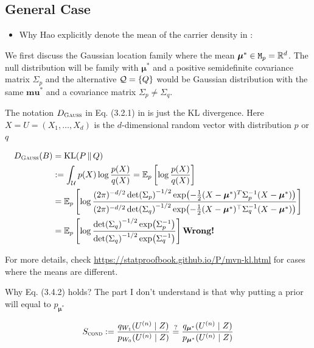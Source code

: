 \subsection{General Case}

\begin{itemize}
	\item Why Hao explicitly denote the mean of the carrier density in \cite{grunwaldSafeTesting2024}:
\end{itemize}

We first discuss the Gaussian location family where the mean $\bm{\mu}^*\in\mathtt{M}_p=\mathbb{R}^d$.
The null distribution will be family with $\bm{\mu}^*$ and a positive semidefinite covariance matrix $\Sigma_p$
and the alternative $\mathcal{Q}=\{Q\}$ would be Gaussian distribution with the same $\bm{mu}^*$ and
a covariance matrix $\Sigma_p \not= \Sigma_q$.

The notation $D_{\textsc{Gauss}}$ in Eq. (3.2.1) in \cite{haoEvaluesAnytimevalidInference2025} is
just the KL divergence. Here $X=U=(X_1,\dots,X_d)$ is the $d$-dimensional random vector with
distribution $p$ or $q$

\begin{align*}
	D_{\textsc{Gauss}}(B) & = \KL{P}{Q}                                                                                                            \\
	                      & := \int_{\Uc} p(X) \log \frac{p(X)}{q(X)}
	= \ERWi{p}{\log\frac{p(X)}{q(X)}}                                                                                                              \\
	                      & = \ERWi{p}{\log\frac{(2\pi)^{-d/2} \det(\Sigma_p)^{-1/2}\exp(-\frac{1}{2}(X-\bm{\mu}^*)^T \Sigma_p^{-1}(X-\bm{\mu}^*))}
		                          {(2\pi)^{-d/2} \det(\Sigma_q)^{-1/2}\exp(-\frac{1}{2}(X-\bm{\mu}^*)^\top \Sigma_q^{-1}(X-\bm{\mu}^*))}} \\
	                      & = \ERWi{p}{\log\frac{\det(\Sigma_q)^{-1/2} \exp(\Sigma_p^{-1})}{\det(\Sigma_q)^{-1/2}\exp(\Sigma_q^{-1})}} \qq{Wrong!}
\end{align*}

For more details, check \url{https://statproofbook.github.io/P/mvn-kl.html} for cases where the means are different.

Why Eq. (3.4.2) holds? The part I don't understand is that
why putting a prior will equal to $p_{\bm{\mu}^*}$

\begin{align*}
	S_{\textsc{cond}} := \frac{q_{W_1}(U^{(n)} \;|\; Z)}{p_{W_0}(U^{(n)} \;|\; Z)}
	\stackrel{?}{=} \frac{q_{\bm{\mu}^*}(U^{(n)} \;|\; Z)}{p_{\bm{\mu}^*}(U^{(n)} \;|\; Z)}
\end{align*}

